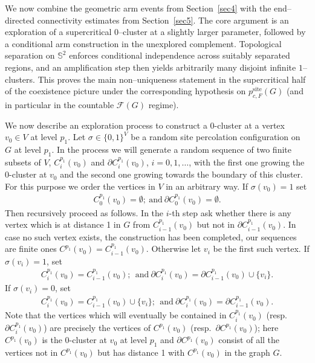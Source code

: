 \documentclass[11pt]{amsart}
\theoremstyle{plain}
\numberwithin{equation}{section}
\numberwithin{figure}{section}
\newcommand\si{\sigma}
\begin{document}
We now combine the geometric arm events from Section~\ref{sec4} with the end--directed
connectivity estimates from Section~\ref{sec5}.
The core argument is an exploration of a supercritical $0$--cluster at a slightly larger parameter,
followed by a conditional arm construction in the unexplored complement.
Topological separation on $\mathbb S^2$ enforces conditional independence across suitably separated
regions, and an amplification step then yields arbitrarily many disjoint infinite $1$--clusters.
This proves the main non--uniqueness statement in the supercritical half of the coexistence picture
under the corresponding hypothesis on $p^{\mathrm{site}}_{c,F}(G)$ (and in particular in the countable
$\mathcal F(G)$ regime).




We now describe an exploration process to construct a 0-cluster at a vertex $v_0\in V$ at level $p_1$. Let $\si\in\{0,1\}^V$ be a random site percolation configuration on $G$ at level $p_1$. In the process we will generate a random sequence of two finite subsets of $V$, $C_i^{p_1}(v_0)$ and $\partial C_i^{p_1}(v_0)$, $i=0,1,\ldots$, with the first one growing the 0-cluster at $v_0$ and the second one growing towards the boundary of this cluster. For this purpose we order the vertices in $V$ in an arbitrary way. If $\si(v_0)=1$ set
\begin{align*}
C_0^{p_1}(v_0)=\emptyset;\ \mathrm{and}\ \partial C_0^{p_1}(v_0)=\emptyset.
\end{align*}
Then recursively proceed as follows. In the $i$-th step ask whether there is any vertex which is at distance 1 in $G$ from $C_{i-1}^{p_1}(v_0)$ but not in $\partial C_{i-1}^{p_1}(v_0)$. In case no such vertex exists, the construction has been completed, our sequences are finite ones $C^{p_1}(v_0)=C_{i-1}^{p_1}(v_0)$. Otherwise let $v_i$ be the first such vertex. If $\sigma(v_i)=1$, set
\begin{align*}
C_i^{p_1}(v_0)=C_{i-1}^{p_1}(v_0);\ \ \mathrm{and}\ \partial C_i^{p_1}(v_0)=
\partial C_{i-1}^{p_1}(v_0)\cup\{v_i\}.
\end{align*}
If $\sigma(v_i)=0$, set
\begin{align*}
C_i^{p_1}(v_0)=C_{i-1}^{p_1}(v_0)\cup \{v_i\};\ \ \mathrm{and}\ \partial C_i^{p_1}(v_0)=
\partial C_{i-1}^{p_1}(v_0).
\end{align*}
Note that the vertices which will eventually be contained in $C_i^{p_1}(v_0)$ (resp.\ $\partial C_i^{p_1}(v_0)$) are precisely the vertices of $C^{p_1}(v_0)$ (resp.\ $\partial C^{p_1}(v_0)$); here $C^{p_1}(v_0)$ is the 0-cluster at $v_0$ at level $p_1$ and $\partial C^{p_1}(v_0)$ consist of all the vertices not in $C^{p_1}(v_0)$ but has distance 1 with $C^{p_1}(v_0)$ in the graph $G$.
\end{document}
